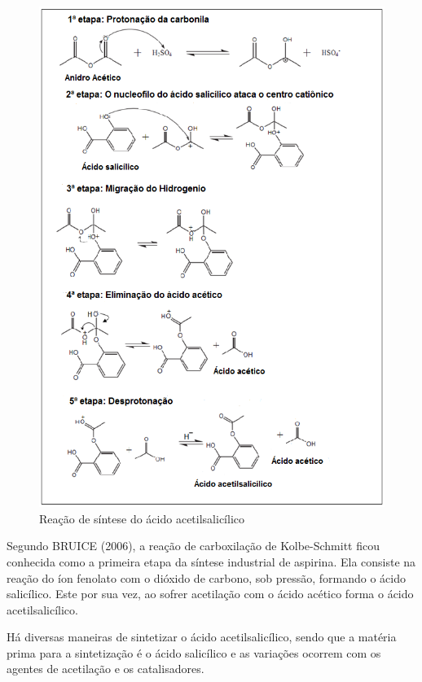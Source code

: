 \begin{figure}[H]
\begin{center}
    \includegraphics[width=1.1\textwidth]{figuras/im2_sintese.png}
\end{center}
\caption{Reação de síntese do ácido acetilsalicílico~\cite{Silva2010}}\label{fig:im2}%
\end{figure}

Segundo BRUICE (2006), a reação de carboxilação de Kolbe-Schmitt ficou conhecida como a primeira
etapa da síntese industrial de aspirina. Ela consiste na reação do íon fenolato com o dióxido de
carbono, sob pressão, formando o ácido salicílico. Este por sua vez, ao sofrer acetilação com o
ácido acético forma o ácido acetilsalicílico.~\cite{Bruice2006}

Há diversas maneiras de sintetizar o ácido acetilsalicílico, sendo que a matéria prima para a
sintetização é o ácido salicílico e as variações ocorrem com os agentes de acetilação e os
catalisadores.

